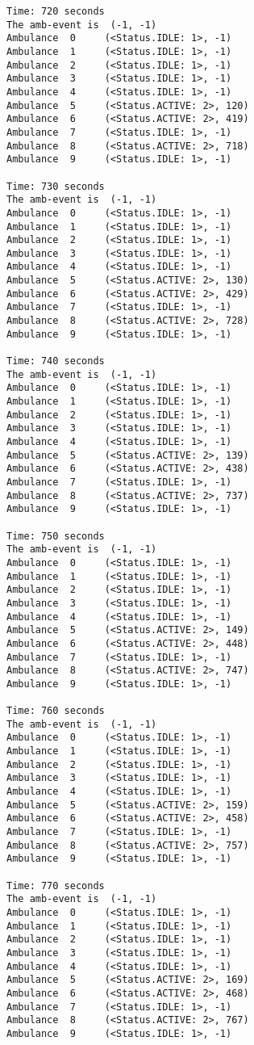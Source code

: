\documentclass[11pt]{article}
\begin{document}
\begin{Verbatim}[commandchars=\\\{\}]
Time: 720 seconds
The amb-event is  (-1, -1)
Ambulance  0	 (<Status.IDLE: 1>, -1)
Ambulance  1	 (<Status.IDLE: 1>, -1)
Ambulance  2	 (<Status.IDLE: 1>, -1)
Ambulance  3	 (<Status.IDLE: 1>, -1)
Ambulance  4	 (<Status.IDLE: 1>, -1)
Ambulance  5	 (<Status.ACTIVE: 2>, 120)
Ambulance  6	 (<Status.ACTIVE: 2>, 419)
Ambulance  7	 (<Status.IDLE: 1>, -1)
Ambulance  8	 (<Status.ACTIVE: 2>, 718)
Ambulance  9	 (<Status.IDLE: 1>, -1)

Time: 730 seconds
The amb-event is  (-1, -1)
Ambulance  0	 (<Status.IDLE: 1>, -1)
Ambulance  1	 (<Status.IDLE: 1>, -1)
Ambulance  2	 (<Status.IDLE: 1>, -1)
Ambulance  3	 (<Status.IDLE: 1>, -1)
Ambulance  4	 (<Status.IDLE: 1>, -1)
Ambulance  5	 (<Status.ACTIVE: 2>, 130)
Ambulance  6	 (<Status.ACTIVE: 2>, 429)
Ambulance  7	 (<Status.IDLE: 1>, -1)
Ambulance  8	 (<Status.ACTIVE: 2>, 728)
Ambulance  9	 (<Status.IDLE: 1>, -1)

Time: 740 seconds
The amb-event is  (-1, -1)
Ambulance  0	 (<Status.IDLE: 1>, -1)
Ambulance  1	 (<Status.IDLE: 1>, -1)
Ambulance  2	 (<Status.IDLE: 1>, -1)
Ambulance  3	 (<Status.IDLE: 1>, -1)
Ambulance  4	 (<Status.IDLE: 1>, -1)
Ambulance  5	 (<Status.ACTIVE: 2>, 139)
Ambulance  6	 (<Status.ACTIVE: 2>, 438)
Ambulance  7	 (<Status.IDLE: 1>, -1)
Ambulance  8	 (<Status.ACTIVE: 2>, 737)
Ambulance  9	 (<Status.IDLE: 1>, -1)

Time: 750 seconds
The amb-event is  (-1, -1)
Ambulance  0	 (<Status.IDLE: 1>, -1)
Ambulance  1	 (<Status.IDLE: 1>, -1)
Ambulance  2	 (<Status.IDLE: 1>, -1)
Ambulance  3	 (<Status.IDLE: 1>, -1)
Ambulance  4	 (<Status.IDLE: 1>, -1)
Ambulance  5	 (<Status.ACTIVE: 2>, 149)
Ambulance  6	 (<Status.ACTIVE: 2>, 448)
Ambulance  7	 (<Status.IDLE: 1>, -1)
Ambulance  8	 (<Status.ACTIVE: 2>, 747)
Ambulance  9	 (<Status.IDLE: 1>, -1)

Time: 760 seconds
The amb-event is  (-1, -1)
Ambulance  0	 (<Status.IDLE: 1>, -1)
Ambulance  1	 (<Status.IDLE: 1>, -1)
Ambulance  2	 (<Status.IDLE: 1>, -1)
Ambulance  3	 (<Status.IDLE: 1>, -1)
Ambulance  4	 (<Status.IDLE: 1>, -1)
Ambulance  5	 (<Status.ACTIVE: 2>, 159)
Ambulance  6	 (<Status.ACTIVE: 2>, 458)
Ambulance  7	 (<Status.IDLE: 1>, -1)
Ambulance  8	 (<Status.ACTIVE: 2>, 757)
Ambulance  9	 (<Status.IDLE: 1>, -1)

Time: 770 seconds
The amb-event is  (-1, -1)
Ambulance  0	 (<Status.IDLE: 1>, -1)
Ambulance  1	 (<Status.IDLE: 1>, -1)
Ambulance  2	 (<Status.IDLE: 1>, -1)
Ambulance  3	 (<Status.IDLE: 1>, -1)
Ambulance  4	 (<Status.IDLE: 1>, -1)
Ambulance  5	 (<Status.ACTIVE: 2>, 169)
Ambulance  6	 (<Status.ACTIVE: 2>, 468)
Ambulance  7	 (<Status.IDLE: 1>, -1)
Ambulance  8	 (<Status.ACTIVE: 2>, 767)
Ambulance  9	 (<Status.IDLE: 1>, -1)


\end{Verbatim}
\end{document}
